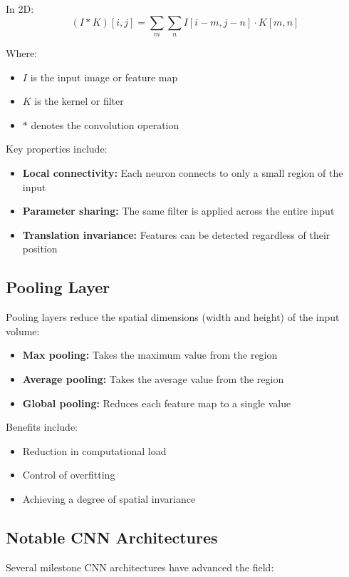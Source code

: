 \documentclass[11pt,a4paper]{report}
\begin{document}
In 2D:
\begin{equation}
(I * K)[i,j] = \sum_{m}\sum_{n} I[i-m,j-n] \cdot K[m,n]
\end{equation}

Where:
\begin{itemize}
    \item $I$ is the input image or feature map
    \item $K$ is the kernel or filter
    \item $*$ denotes the convolution operation
\end{itemize}

Key properties include:
\begin{itemize}
    \item \textbf{Local connectivity:} Each neuron connects to only a small region of the input
    \item \textbf{Parameter sharing:} The same filter is applied across the entire input
    \item \textbf{Translation invariance:} Features can be detected regardless of their position
\end{itemize}

\subsection{Pooling Layer}
Pooling layers reduce the spatial dimensions (width and height) of the input volume:

\begin{itemize}
    \item \textbf{Max pooling:} Takes the maximum value from the region
    \item \textbf{Average pooling:} Takes the average value from the region
    \item \textbf{Global pooling:} Reduces each feature map to a single value
\end{itemize}

Benefits include:
\begin{itemize}
    \item Reduction in computational load
    \item Control of overfitting
    \item Achieving a degree of spatial invariance
\end{itemize}

\subsection{Notable CNN Architectures}
Several milestone CNN architectures have advanced the field:
\end{document}
